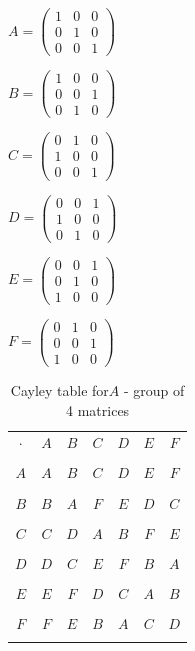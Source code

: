 \begin{multicols}{3}
$A =
\begin{pmatrix}
1 & 0 & 0 \\
0 & 1 & 0 \\
0 & 0 & 1
\end{pmatrix}$

$B =
\begin{pmatrix}
1 & 0 & 0 \\
0 & 0 & 1 \\
0 & 1 & 0
\end{pmatrix}$

$C =
\begin{pmatrix}
0 & 1 & 0 \\
1 & 0 & 0 \\
0 & 0 & 1
\end{pmatrix}$

$D =
\begin{pmatrix}
0 & 0 & 1 \\
1 & 0 & 0 \\
0 & 1 & 0
\end{pmatrix}$

$E =
\begin{pmatrix}
0 & 0 & 1 \\
0 & 1 & 0 \\
1 & 0 & 0
\end{pmatrix}$

$F =
\begin{pmatrix}
0 & 1 & 0 \\
0 & 0 & 1 \\
1 & 0 & 0
\end{pmatrix}$
\end{multicols}

\begin{table}[H]
\caption{Cayley table for$A$ - group of 4 matrices}
{\small
\begin{center}
\begin{tabular}{c|cccccc}
$\cdot$ & $A$
& $B$ 
& $C$
& $D$
& $E$  
& $F$
\\
\\
\hline
$A$
&$A$
& $B$ 
& $C$
& $D$
& $E$  
& $F$\\
\\
$B$    
& $B$ 
& $A$
& $F$
& $E$
& $D$
& $C$\\
\\
$C$  
& $C$
&  $D$
&$A$
& $B$ 
& $F$
& $E$\\
\\
 $D$ 
&  $D$
& $C$
& $E$
&$F$
& $B$
& $A$\\
\\
$E$
& $E$
& $F$
&  $D$
& $C$
& $A$
& $B$
\\
\\
$F$
& $F$
& $E$
& $B$
& $A$
& $C$
& $D$
\\
\\
\end{tabular}
\end{center}
}
\end{table}

